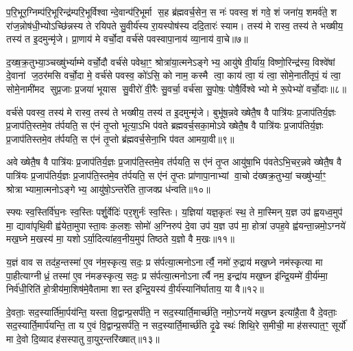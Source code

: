 प॒रि॒भूर॒ग्निम्प॑रि॒भूरिन्द्र॑म्परि॒भूर्विश्वान्दे॒वान्प॑रि॒भूर्मा स॒ह ब्र॑ह्मवर्च॒सेन॒ स नः॑ पवस्व॒ शं गवे॒ शं जना॑य॒ शमर्व॑ते॒ श रा॑ज॒न्नोष॑धी॒भ्योऽच्छि॑न्नस्य ते रयिपते सु॒वीर्य॑स्य रा॒यस्पोष॑स्य ददि॒तारः॑ स्याम। तस्य॑ मे रास्व॒ तस्य॑ ते भख्षीय॒ तस्य॑ त इ॒दमुन्मृ॑जे। प्रा॒णाय॑ मे वर्चो॒दा वर्च॑से पवस्वापा॒नाय॑ व्या॒नाय॑ वा॒चे॥७॥

द॒ख्ष॒क्र॒तुभ्या॒ञ्चख्षु॑र्भ्याम्मे वर्चो॒दौ वर्च॑से पवेथा॒ꣳ॒ श्रोत्रा॑या॒त्मनेऽङ्गेभ्य॒ आयु॑षे वी॒र्या॑य॒ विष्णो॒रिन्द्र॑स्य॒ विश्वे॑षां दे॒वानां ज॒ठर॑मसि वर्चो॒दा मे॒ वर्च॑से पवस्व॒ को॑ऽसि॒ को नाम॒ कस्मै त्वा॒ काय॑ त्वा॒ यं त्वा॒ सोमे॒नाती॑तृपं॒ यं त्वा॒ सोमे॒नामी॑मद सुप्र॒जाः प्र॒जया॑ भूयास सु॒वीरो॑ वी॒रैः सु॒वर्चा॒ वर्च॑सा सु॒पोषः॒ पोषै॒र्विश्वेभ्यो मे रू॒पेभ्यो॑ वर्चो॒दाः॥८॥

वर्च॑से पवस्व॒ तस्य॑ मे रास्व॒ तस्य॑ ते भख्षीय॒ तस्य॑ त इ॒दमुन्मृ॑जे। बुभू॑ष॒न्नवेख्षेतै॒ष वै पात्रि॑यः प्र॒जाप॑तिर्य॒ज्ञः प्र॒जाप॑ति॒स्तमे॒व त॑र्पयति॒ स ए॑नं तृ॒प्तो भूत्या॒ऽभि प॑वते ब्रह्मवर्च॒सका॒मोऽवेख्षेतै॒ष वै पात्रि॑यः प्र॒जाप॑तिर्य॒ज्ञः प्र॒जाप॑तिस्तमे॒व त॑र्पयति॒ स ए॑नं तृ॒प्तो ब्र॑ह्मवर्च॒सेना॒भि प॑वत आमया॒वी॥९॥

अवेख्षेतै॒ष वै पात्रि॑यः प्र॒जाप॑तिर्य॒ज्ञः प्र॒जाप॑ति॒स्तमे॒व त॑र्पयति॒ स ए॑नं तृ॒प्त आयु॑षा॒भि प॑वतेऽभि॒चर॒न्नवेख्षेतै॒ष वै पात्रि॑यः प्र॒जाप॑तिर्य॒ज्ञः प्र॒जाप॑ति॒स्तमे॒व त॑र्पयति॒ स ए॑नं तृ॒प्तः प्रा॑णापा॒नाभ्यां वा॒चो द॑ख्षक्र॒तुभ्यां॒ चख्षु॑र्भ्या॒ꣳ॒ श्रोत्राभ्यामा॒त्मनोऽङ्गेभ्य॒ आयु॑षो॒ऽन्तरे॑ति ता॒जक्प्र ध॑न्वति॥१०॥

{\anuvakamend[{वा॒चे रू॒पेभ्यो॑ वर्चो॒दा आ॑मया॒वी पञ्च॑चत्वारिशच्च॥३॥}]}

स्फ्यः स्व॒स्तिर्वि॑घ॒नः स्व॒स्तिः पर्\mbox{}शु॒र्वेदिः॑ पर॒शुर्नः॑ स्व॒स्तिः। य॒ज्ञिया॑ यज्ञ॒कृतः॑ स्थ॒ ते मा॒स्मिन् य॒ज्ञ उप॑ ह्वयध्व॒मुप॑ मा॒ द्यावा॑पृथि॒वी ह्व॑येता॒मुपास्ता॒वः क॒लशः॒ सोमो॑ अ॒ग्निरुप॑ दे॒वा उप॑ य॒ज्ञ उप॑ मा॒ होत्रा॑ उपह॒वे ह्व॑यन्ता॒न्नमो॒ऽग्नये॑ मख॒घ्ने म॒खस्य॑ मा॒ यशोऽर्या॒दित्या॑हव॒नीय॒मुप॑ तिष्ठते य॒ज्ञो वै म॒खः॥११॥

य॒ज्ञं वाव स तद॑ह॒न्तस्मा॑ ए॒व न॑म॒स्कृत्य॒ सदः॒ प्र स॑र्पत्या॒त्मनोऽनार्त्यै॒ नमो॑ रु॒द्राय॑ मख॒घ्ने नम॑स्कृत्या मा पा॒हीत्याग्नीध्रं॒ तस्मा॑ ए॒व न॑मङस्कृत्य॒ सदः॒ प्र स॑र्पत्या॒त्मनोऽनार्त्यै नम॒ इन्द्रा॑य मख॒घ्न इ॑न्द्रि॒यम्मे॑ वी॒र्य॑म्मा॒ निर्व॑धी॒रिति॑ हो॒त्रीय॑मा॒शिष॑मे॒वैतामा शास्त इन्द्रि॒यस्य॑ वी॒र्य॑स्यानि॑र्घाताय॒ या वै॥१२॥

दे॒वताः॒ सद॒स्यार्ति॑मा॒र्पय॑न्ति॒ यस्ता वि॒द्वान्प्र॒सर्प॑ति॒ न सद॒स्यार्ति॒मार्च्छ॑ति॒ नमो॒ऽग्नये॑ मख॒घ्न इत्या॑है॒ता वै दे॒वताः॒ सद॒स्यार्ति॒मार्प॑यन्ति॒ ता य ए॒वं वि॒द्वान्प्र॒सर्प॑ति॒ न सद॒स्यार्ति॒मार्च्छ॑ति दृ॒ढे स्थः॑ शिथि॒रे स॒मीची॒ माह॑सस्पात॒ꣳ॒ सूर्यो॑ मा दे॒वो दि॒व्यादह॑सस्पातु वा॒युर॒न्तरि॑ख्षात्॥१३॥

